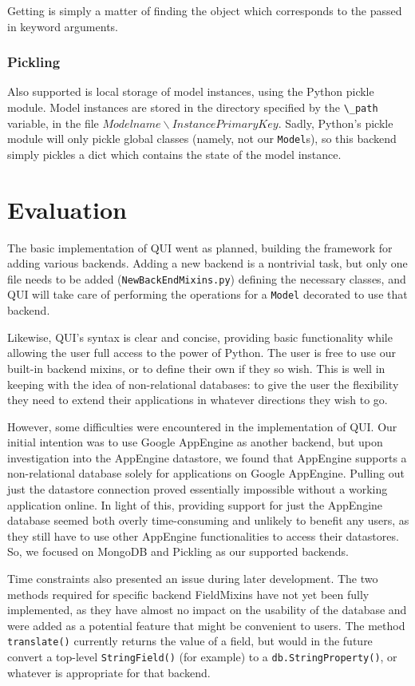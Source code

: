 \documentclass{article} %
\newcommand{\il}[1]{\mbox{\lstinline{#1}}}
\begin{document}
	Getting is simply a matter of finding the object which corresponds to the passed in keyword arguments.
	
\subsubsection{Pickling}
	Also supported is local storage of model instances, using the Python pickle module. Model instances are stored in the directory specified by the \il{\_path} variable, in
	the file $Modelname\backslash InstancePrimaryKey$. Sadly, Python's pickle module will only pickle global classes (namely, not our \il{Model}s), so this backend simply pickles a dict
	which contains the state of the model instance.

	
		
			
\newpage	
\section{Evaluation}
The basic implementation of QUI went as planned, building the framework for adding various backends. Adding a new backend is a nontrivial task, but only one file needs to be added
(\il{NewBackEndMixins.py}) defining the necessary classes, and QUI will take care of performing the operations for a \il{Model} decorated to use that backend.

Likewise, QUI's syntax is clear and concise, providing basic functionality while allowing the user full access to the power of Python. The user is free to use our built-in backend mixins, or 
to define their own if they so wish. This is well in keeping with the idea of non-relational databases: to give the user the flexibility they need to extend their applications in whatever
directions they wish to go.

However, some difficulties were encountered in the implementation of QUI. Our initial intention was to use Google AppEngine as another backend, but upon investigation into the AppEngine
datastore, we found that AppEngine supports a non-relational database solely for applications on Google AppEngine. Pulling out just the datastore connection proved essentially impossible 
without a working application online. In light of this, providing support for just the AppEngine database seemed both overly time-consuming and unlikely to benefit any users, as they
still have to use other AppEngine functionalities to access their datastores. So, we focused on MongoDB and Pickling as our supported backends.

Time constraints also presented an issue during later development. The two methods required for specific backend FieldMixins have not yet been fully implemented, as 
they have almost no impact on the usability of the database and were added as a potential feature that might be convenient to users. The method \il{translate()} currently returns the 
value of a field, but would in the future convert a top-level \il{StringField()} (for example) to a \il{db.StringProperty()}, or whatever is appropriate for that backend.
\end{document}
